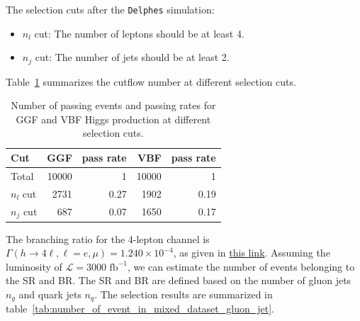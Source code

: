 \documentclass[12pt]{article}
\begin{document}
        The selection cuts after the \verb|Delphes| simulation:
        \begin{itemize}
            \item $n_{l}$ cut: The number of leptons should be at least 4.
            \item $n_{j}$ cut: The number of jets should be at least 2.
        \end{itemize}

        Table~\ref{tab:GGF_VBF_Higgs_cutflow_number} summarizes the cutflow number at different selection cuts.
        \begin{table}[htpb]
            \centering
            \caption{Number of passing events and passing rates for GGF and VBF Higgs production at different selection cuts.}
            \label{tab:GGF_VBF_Higgs_cutflow_number}
            \begin{tabular}{l|rr|rr}
                Cut         & GGF   & pass rate & VBF   & pass rate \\ \hline
                Total       & 10000 & 1         & 10000 & 1         \\
                $n_{l}$ cut & 2731  & 0.27      & 1902  & 0.19      \\
                $n_j$ cut   & 687   & 0.07      & 1650  & 0.17
            \end{tabular}
        \end{table}

        The branching ratio for the 4-lepton channel is $\Gamma\left( h \to 4\ell, \ell = e, \mu \right) = 1.240 \times 10^{-4}$, as given in \href{https://twiki.cern.ch/twiki/bin/view/LHCPhysics/CERNYellowReportPageBR}{this link}. Assuming the luminosity of $\mathcal{L} = \text{3000 fb}^{-1}$, we can estimate the number of events belonging to the SR and BR. The SR and BR are defined based on the number of gluon jets $n_g$ and quark jets $n_q$. The selection results are summarized in table~\ref{tab:number_of_event_in_mixed_dataset_gluon_jet}.
\end{document}
